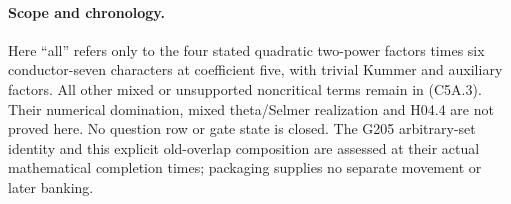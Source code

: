 \paragraph{Scope and chronology.}
Here ``all'' refers only to the four stated quadratic two-power
factors times six conductor-seven characters at coefficient five,
with trivial Kummer and auxiliary factors.
All other mixed or unsupported noncritical terms remain in (C5A.3).
Their numerical domination, mixed theta/Selmer realization and
H04.4 are not proved here. No question row or gate state is closed.
The G205 arbitrary-set identity and this explicit old-overlap
composition are assessed at their actual mathematical completion
times; packaging supplies no separate movement or later banking.
